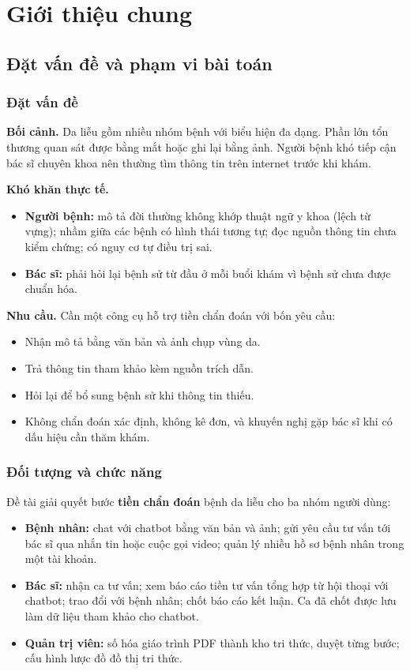 \chapter[\MakeUppercase{Giới thiệu chung}]{Giới thiệu chung}
\label{ch:chuong1}

\section{Đặt vấn đề và phạm vi bài toán}

\subsection{Đặt vấn đề}

\textbf{Bối cảnh.} Da liễu gồm nhiều nhóm bệnh với biểu hiện đa dạng. Phần lớn tổn thương quan sát được bằng mắt hoặc ghi lại bằng ảnh. Người bệnh khó tiếp cận bác sĩ chuyên khoa nên thường tìm thông tin trên internet trước khi khám.

\textbf{Khó khăn thực tế.}
\begin{itemize}
  \item \textbf{Người bệnh:} mô tả đời thường không khớp thuật ngữ y khoa (lệch từ vựng); nhầm giữa các bệnh có hình thái tương tự; đọc nguồn thông tin chưa kiểm chứng; có nguy cơ tự điều trị sai.
  \item \textbf{Bác sĩ:} phải hỏi lại bệnh sử từ đầu ở mỗi buổi khám vì bệnh sử chưa được chuẩn hóa.
\end{itemize}

\textbf{Nhu cầu.} Cần một công cụ hỗ trợ tiền chẩn đoán với bốn yêu cầu:
\begin{itemize}
  \item Nhận mô tả bằng văn bản và ảnh chụp vùng da.
  \item Trả thông tin tham khảo kèm nguồn trích dẫn.
  \item Hỏi lại để bổ sung bệnh sử khi thông tin thiếu.
  \item Không chẩn đoán xác định, không kê đơn, và khuyến nghị gặp bác sĩ khi có dấu hiệu cần thăm khám.
\end{itemize}

\subsection{Đối tượng và chức năng}

Đề tài giải quyết bước \textbf{tiền chẩn đoán} bệnh da liễu cho ba nhóm người dùng:
\begin{itemize}
  \item \textbf{Bệnh nhân:} chat với chatbot bằng văn bản và ảnh; gửi yêu cầu tư vấn tới bác sĩ qua nhắn tin hoặc cuộc gọi video; quản lý nhiều hồ sơ bệnh nhân trong một tài khoản.
  \item \textbf{Bác sĩ:} nhận ca tư vấn; xem báo cáo tiền tư vấn tổng hợp từ hội thoại với chatbot; trao đổi với bệnh nhân; chốt báo cáo kết luận. Ca đã chốt được lưu làm dữ liệu tham khảo cho chatbot.
  \item \textbf{Quản trị viên:} số hóa giáo trình PDF thành kho tri thức, duyệt từng bước; cấu hình lược đồ đồ thị tri thức.
\end{itemize}

